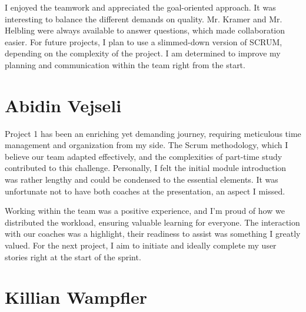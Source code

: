 I enjoyed the teamwork and appreciated the goal-oriented approach.
It was interesting to balance the different demands on quality.
Mr. Kramer and Mr. Helbling were always available to answer questions, which made collaboration easier.
For future projects, I plan to use a slimmed-down version of SCRUM, depending on the complexity of the project.
I am determined to improve my planning and communication within the team right from the start.

\section{Abidin Vejseli}
Project 1 has been an enriching yet demanding journey, requiring meticulous time management and organization from my side.
The Scrum methodology, which I believe our team adapted effectively, and the complexities of part-time study contributed to this challenge.
Personally, I felt the initial module introduction was rather lengthy and could be condensed to the essential elements.
It was unfortunate not to have both coaches at the presentation, an aspect I missed.

Working within the team was a positive experience, and I'm proud of how we distributed the workload, ensuring valuable learning for everyone.
The interaction with our coaches was a highlight, their readiness to assist was something I greatly valued.
For the next project, I aim to initiate and ideally complete my user stories right at the start of the sprint.

\section{Killian Wampfler}
